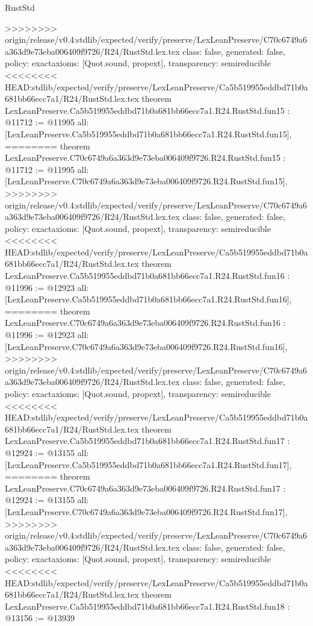 \begin{lexlean}{RustStd}
\begin{coremodule}
{\begin{coremodule}
{{{{{{{{{{{{{{{{{{>>>>>>>> origin/release/v0.4:stdlib/expected/verify/preserve/LexLeanPreserve/C70c6749a6a363d9e73eba006409f9726/R24/RustStd.lex.tex
  class: false,
  generated: false,
  policy: exact{axioms: [Quot.sound, propext]},
  transparency: semireducible
}
<<<<<<<< HEAD:stdlib/expected/verify/preserve/LexLeanPreserve/Ca5b519955eddbd71b0a681bb66ecc7a1/R24/RustStd.lex.tex
theorem LexLeanPreserve.Ca5b519955eddbd71b0a681bb66ecc7a1.R24.RustStd.fun15 : @11712 := @11995 {
  all: [LexLeanPreserve.Ca5b519955eddbd71b0a681bb66ecc7a1.R24.RustStd.fun15],
========
theorem LexLeanPreserve.C70c6749a6a363d9e73eba006409f9726.R24.RustStd.fun15 : @11712 := @11995 {
  all: [LexLeanPreserve.C70c6749a6a363d9e73eba006409f9726.R24.RustStd.fun15],
>>>>>>>> origin/release/v0.4:stdlib/expected/verify/preserve/LexLeanPreserve/C70c6749a6a363d9e73eba006409f9726/R24/RustStd.lex.tex
  class: false,
  generated: false,
  policy: exact{axioms: [Quot.sound, propext]},
  transparency: semireducible
}
<<<<<<<< HEAD:stdlib/expected/verify/preserve/LexLeanPreserve/Ca5b519955eddbd71b0a681bb66ecc7a1/R24/RustStd.lex.tex
theorem LexLeanPreserve.Ca5b519955eddbd71b0a681bb66ecc7a1.R24.RustStd.fun16 : @11996 := @12923 {
  all: [LexLeanPreserve.Ca5b519955eddbd71b0a681bb66ecc7a1.R24.RustStd.fun16],
========
theorem LexLeanPreserve.C70c6749a6a363d9e73eba006409f9726.R24.RustStd.fun16 : @11996 := @12923 {
  all: [LexLeanPreserve.C70c6749a6a363d9e73eba006409f9726.R24.RustStd.fun16],
>>>>>>>> origin/release/v0.4:stdlib/expected/verify/preserve/LexLeanPreserve/C70c6749a6a363d9e73eba006409f9726/R24/RustStd.lex.tex
  class: false,
  generated: false,
  policy: exact{axioms: [Quot.sound, propext]},
  transparency: semireducible
}
<<<<<<<< HEAD:stdlib/expected/verify/preserve/LexLeanPreserve/Ca5b519955eddbd71b0a681bb66ecc7a1/R24/RustStd.lex.tex
theorem LexLeanPreserve.Ca5b519955eddbd71b0a681bb66ecc7a1.R24.RustStd.fun17 : @12924 := @13155 {
  all: [LexLeanPreserve.Ca5b519955eddbd71b0a681bb66ecc7a1.R24.RustStd.fun17],
========
theorem LexLeanPreserve.C70c6749a6a363d9e73eba006409f9726.R24.RustStd.fun17 : @12924 := @13155 {
  all: [LexLeanPreserve.C70c6749a6a363d9e73eba006409f9726.R24.RustStd.fun17],
>>>>>>>> origin/release/v0.4:stdlib/expected/verify/preserve/LexLeanPreserve/C70c6749a6a363d9e73eba006409f9726/R24/RustStd.lex.tex
  class: false,
  generated: false,
  policy: exact{axioms: [Quot.sound, propext]},
  transparency: semireducible
}
<<<<<<<< HEAD:stdlib/expected/verify/preserve/LexLeanPreserve/Ca5b519955eddbd71b0a681bb66ecc7a1/R24/RustStd.lex.tex
theorem LexLeanPreserve.Ca5b519955eddbd71b0a681bb66ecc7a1.R24.RustStd.fun18 : @13156 := @13939 {
}}}}}}}}}}}}}}}}}}}}}
\end{coremodule}}
\end{coremodule}
\end{lexlean}
